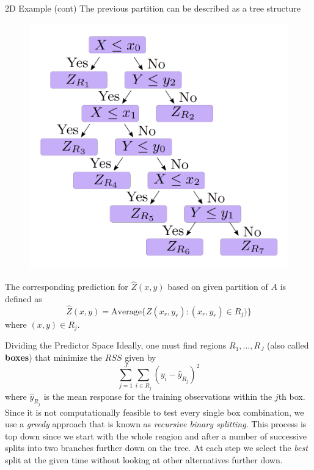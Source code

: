 \documentclass{beamer}
\begin{document}
\begin{frame}{2D Example (cont)}
The previous partition can be described as a tree structure
\begin{figure}[h]
	\centering
	\includegraphics[scale=0.3]{../../Figures/fig_tree_trans.png}
\end{figure}

The corresponding prediction for $\widehat{Z}(x,y)$ based on given partition of $A$ is defined as 
\begin{equation*}
	\widehat{Z}(x,y)= \textrm{Average} \{ Z(x_r,y_r)\colon (x_r ,y_r)\in R_j)\}
\end{equation*}
where $(x,y) \in R_j$.

\end{frame}

\begin{frame}{Dividing the Predictor Space}
	Ideally, one must find regions $R_1, \ldots, R_J$ (also called {\bf boxes}) that minimize the $RSS$ given by 
	\begin{equation*}
		\sum_{j=1}^J \sum_{i\in R_j} (y_i - \hat{y}_{R_j})^2
	\end{equation*}
where $\hat{y}_{R_j}$ is the mean response for the training observations within the $j$th box. Since it is not computationally feasible to test every single box combination, we use a {\it greedy} approach that is known as {\it recursive binary splitting}. This process is top down since we start with the whole reagion and after a number of successive splits into two branches further down on the tree. At each step we select the {\it best} split at the given time without looking at other alternatives further down. 
\end{frame}
\end{document}
